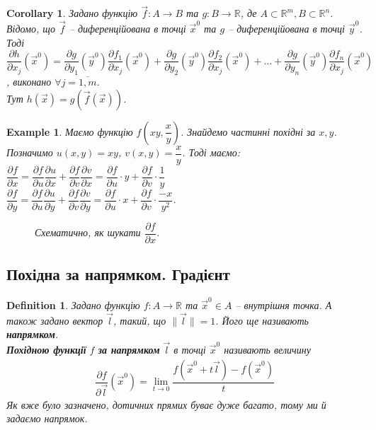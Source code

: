 \documentclass[a4paper, 10pt]{article}
\def\departial#1#2{\dfrac{\partial {#1}}{\partial {#2}}}
\theoremstyle{theoremdd}
\theoremstyle{theoremdd}
\theoremstyle{theoremdd}
\newtheorem{definition}[theorem]{Definition}
\theoremstyle{theoremdd}
\theoremstyle{theoremdd}
\newtheorem{example}[theorem]{Example}
\theoremstyle{theoremdd}
\theoremstyle{theoremdd}
\theoremstyle{theoremdd}
\theoremstyle{theoremdd}
\newtheorem{corollary}[theorem]{Corollary}
\newcommand\Norm[1]{\|#1\|}
\begin{document}
\begin{corollary}
Задано функцію $\vec{f}\colon A \to B$ та $g\colon B \to \mathbb{R}$, де $A \subset \mathbb{R}^m, B \subset \mathbb{R}^n$.\\
Відомо, що $\vec{f}$ -- диференційована в точці $\vec{x}^0$ та $g$ -- диференційована в точці $\vec{y}^0$.\\
Тоді $\departial{h}{x_j}(\vec{x}^0) = \departial{g}{y_1}(\vec{y}^0) \departial{f_1}{x_j}(\vec{x}^0) + \departial{g}{y_2}(\vec{y}^0) \departial{f_2}{x_j}(\vec{x}^0) + \dots + \departial{g}{y_n}(\vec{y}^0) \departial{f_n}{x_j}(\vec{x}^0)$, виконано $\forall j = \overline{1,m}$.\\
Тут $h(\vec{x}) = g(\vec{f}(\vec{x}))$.
\end{corollary}

\begin{example}
Маємо функцію $f\left( xy, \dfrac{x}{y} \right)$. Знайдемо частинні похідні за $x,y$.\\
Позначимо $u(x,y) = xy$, $v(x,y) = \dfrac{x}{y}$. Тоді маємо:\\
$\departial{f}{x} = \departial{f}{u} \departial{u}{x} + \departial{f}{v} \departial{v}{x} = \departial{f}{u} \cdot y + \departial{f}{v} \cdot \dfrac{1}{y}$\\
$\departial{f}{y} = \departial{f}{u} \departial{u}{y} + \departial{f}{v} \departial{v}{y} = \departial{f}{u} \cdot x + \departial{f}{v} \cdot \dfrac{-x}{y^2}$.
\begin{figure}[H]
\centering
{}
\caption*{Схематично, як шукати $\departial{f}{x}$.}
\end{figure}
\end{example}

\subsection{Похідна за напрямком. Градієнт}
\begin{definition}
Задано функцію $f\colon A \to \mathbb{R}$ та $\vec{x}^0 \in A$ -- внутрішня точка. А також задано вектор $\vec{l}$, такий, що $\Norm{\vec{l}} = 1$. Його ще називають \textbf{напрямком}.\\
\textbf{Похідною функції} $f$ \textbf{за напрямком} $\vec{l}$ в точці $\vec{x}^0$ називають величину
\begin{align*}
\dfrac{\partial f}{\partial \vec{l}} (\vec{x}^0) = \lim_{t \to 0} \dfrac{f(\vec{x}^0+t \vec{l}) - f(\vec{x}^0)}{t}
\end{align*}
Як вже було зазначено, дотичних прямих буває дуже багато, тому ми й задаємо напрямок.
\end{definition}
\end{document}
